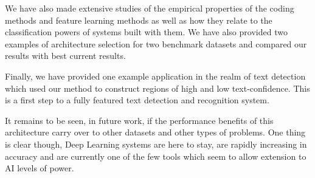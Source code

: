 \documentclass[12pt,a4paper,oneside,english]{UPBThesis}
\begin{document}
We have also made extensive studies of the empirical properties of the coding methods and feature learning methods as well as how they relate to the classification powers of systems built with them. We have also provided two examples of architecture selection for two benchmark datasets and compared our results with best current results.

Finally, we have provided one example application in the realm of text detection which used our method to construct regions of high and low text-confidence. This is a first step to a fully featured text detection and recognition system.

It remains to be seen, in future work, if the performance benefits of this architecture carry over to other datasets and other types of problems. One thing is clear though, Deep Learning systems are here to stay, are rapidly increasing in accuracy and are currently one of the few tools which seem to allow extension to AI levels of power.

\clearpage
\newpage
\thispagestyle{empty}
\mbox{}




\appendix
\end{document}
